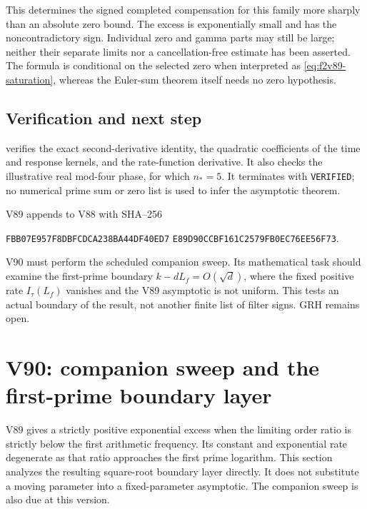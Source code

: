 \documentclass[11pt]{article}
\theoremstyle{definition}
\theoremstyle{remark}
\begin{document}
This determines the signed completed compensation for this family more
sharply than an absolute zero bound.  The excess is exponentially small
and has the noncontradictory sign.  Individual zero and gamma parts may
still be large; neither their separate limits nor a cancellation-free
estimate has been asserted.  The formula is conditional on the selected
zero when interpreted as \eqref{eq:f2v89-saturation}, whereas the
Euler-sum theorem itself needs no zero hypothesis.

\subsection*{Verification and next step}

 verifies the exact
second-derivative identity, the quadratic coefficients of the time and
response kernels, and the rate-function derivative.  It also checks the
illustrative real mod-four phase, for which \(n_*=5\).  It terminates
with \texttt{VERIFIED}; no numerical prime sum or zero list is used to
infer the asymptotic theorem.

V89 appends to V88 with SHA--256
\begin{center}
\texttt{FBB07E957F8DBFCDCA238BA44DF40ED7}\allowbreak
\texttt{E89D90CCBF161C2579FB0EC76EE56F73}.
\end{center}
V90 must perform the scheduled companion sweep.  Its mathematical task
should examine the first-prime boundary \(k-dL_f=O(\sqrt d)\), where
the fixed positive rate \(I_\tau(L_f)\) vanishes and the V89
asymptotic is not uniform.  This tests an actual boundary of the result,
not another finite list of filter signs.  GRH remains open.
\endgroup


\clearpage
\section{V90: companion sweep and the first-prime boundary layer}
\label{sec:f2v90-boundary}
\begingroup
\setcounter{equation}{0}
\renewcommand{\theequation}{N90.\arabic{equation}}
\renewcommand{\theHequation}{f2v90.\arabic{equation}}

V89 gives a strictly positive exponential excess when the limiting
order ratio is strictly below the first arithmetic frequency.  Its
constant and exponential rate degenerate as that ratio approaches the
first prime logarithm.  This section analyzes the resulting
square-root boundary layer directly.  It does not substitute a moving
parameter into a fixed-parameter asymptotic.  The companion sweep is
also due at this version.
\end{document}
